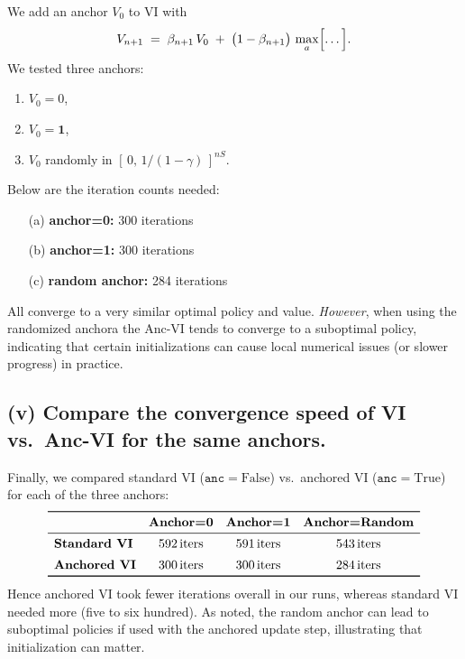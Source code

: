 \noindent
We add an anchor \(V_0\) to VI with
\[
  V_{n+1}
  \;=\;\beta_{n+1}\,V_0 \;+\;\bigl(1-\beta_{n+1}\bigr)\,\max_{a}\Bigl[\dots\Bigr].
\]
We tested three anchors:
\begin{enumerate}[label=(\alph*)]
\item $V_0=0$,
\item $V_0=\mathbf{1}$,
\item $V_0$ randomly in $[\,0,\,1/(1-\gamma)\,]^{nS}$.
\end{enumerate}
Below are the iteration counts needed:
\begin{itemize}
  \item[(a)] \textbf{anchor=0:} 300 iterations
  \item[(b)] \textbf{anchor=1:} 300 iterations
  \item[(c)] \textbf{random anchor:} 284 iterations
\end{itemize}
All converge to a very similar optimal policy and value.  
\emph{However}, when using the randomized anchora the Anc-VI tends to converge to a suboptimal policy,
indicating that certain initializations can cause local numerical issues 
(or slower progress) in practice.

\subsection*{(v) Compare the convergence speed of VI vs.\ Anc-VI for the same anchors.}

\noindent
Finally, we compared standard VI ($\mathtt{anc}=\text{False}$) vs.\ anchored VI ($\mathtt{anc}=\text{True}$) 
for each of the three anchors:
\[
  \begin{array}{lccc}
  \toprule
  & \textbf{Anchor=0} & \textbf{Anchor=1} & \textbf{Anchor=Random} \\
  \midrule
  \textbf{Standard VI} & 592\,\text{iters} & 591\,\text{iters} & 543\,\text{iters} \\[5pt]
  \textbf{Anchored VI} & 300\,\text{iters} & 300\,\text{iters} & 284\,\text{iters} \\
  \bottomrule
  \end{array}
\]
Hence anchored VI took fewer iterations overall in our runs, whereas standard VI needed more 
(five to six hundred).  As noted, the random anchor can lead to suboptimal policies if used 
with the anchored update step, illustrating that initialization can matter.